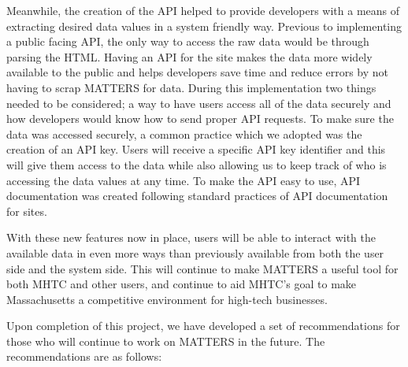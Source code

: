  Meanwhile, the creation of the API helped to provide developers with a means of extracting desired data values in a system friendly way. Previous to implementing a public facing API, the only way to access the raw data would be through parsing the HTML. Having an API for the site makes the data more widely available to the public and helps developers save time and reduce errors by not having to scrap MATTERS for data. During this implementation two things needed to be considered; a way to have users access all of the data securely and how developers would know how to send proper API requests. To make sure the data was accessed securely, a common practice which we adopted was the creation of an API key. Users will receive a specific API key identifier and this will give them access to the data while also allowing us to keep track of who is accessing the data values at any time. To make the API easy to use, API documentation was created following standard practices of API documentation for sites.
 
 With these new features now in place, users will be able to interact with the available data in even more ways than previously available from both the user side and the system side. This will continue to make MATTERS a useful tool for both MHTC and other users, and continue to aid MHTC's goal to make Massachusetts a competitive environment for high-tech businesses.
 
 Upon completion of this project, we have developed a set of recommendations for those who will continue to work on MATTERS in the future. The recommendations are as follows:
 
